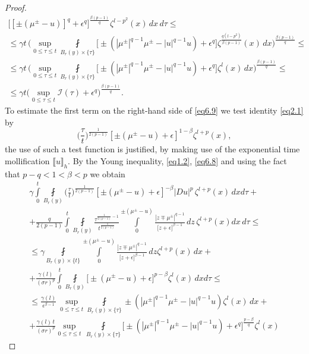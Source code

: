 \documentclass[a4paper,11pt,fullpage]{article}
\numberwithin{equation}{section}
\begin{document}
\begin{proof}
\begin{multline}
\Big[[\pm(\mu^{\pm}-u)]^q+\epsilon^q\Big]^{\frac{\beta (p-1)}{q}}\zeta^{l-p^2}(x)\,dx\,d\tau\leqslant\\\leqslant
\gamma t\,\Big(\sup\limits_{0\leqslant \tau\leqslant t}\fint\limits_{B_{ r}(y)\times\{\tau\}}\big[\pm(|\mu^{\pm}|^{q-1}\mu^{\pm}-|u|^{q-1}u)+\epsilon^q\big]\zeta^{\frac{q (l-p^2)}{\beta (p-1)}}(x)\,dx\Big)
^{\frac{\beta (p-1)}{q}}\leqslant\\\leqslant
\gamma t\,\Big(\sup\limits_{0\leqslant \tau\leqslant t}\fint\limits_{B_{ r}(y)\times\{\tau\}}\big[\pm(|\mu^{\pm}|^{q-1}\mu^{\pm}-|u|^{q-1}u)+\epsilon^q\big]\zeta^l(x)\,dx\Big)
^{\frac{\beta (p-1)}{q}}\leqslant\\\leqslant
\gamma t\Big(\sup\limits_{0\leqslant \tau\leqslant t}\mathcal{I}(\tau)+\epsilon^q\Big)^{\frac{\beta (p-1)}{q}}.
\end{multline}
To estimate the first term on the right-hand side of \eqref{eq6.9} we test identity \eqref{eq2.1} by $$\Big(\frac{\tau}{t}\Big)^{\frac{1}{2(p-1)}}[\pm(\mu^{\pm}-u)+\epsilon]^{1-\beta}\zeta^{l+p}(x),$$ 
the use of such a test function is justified,  by making use of the
exponential time mollification  $\llbracket u \rrbracket_h$.
By the Young inequality, \eqref{eq1.2}, \eqref{eq6.8} and using the fact that $p-q< 1< \beta <p$ we obtain
\begin{multline}\label{eq6.11}
\gamma\int\limits^t_0\fint\limits_{B_{r}(y)}\Big(\frac{\tau}{t}\Big)^{\frac{1}{2(p-1)}}[\pm(\mu^{\pm}-u)+\epsilon]^{-\beta}|D u|^{p}\,\zeta^{l+p}(x)\,dx d\tau+\\+\frac{q}{2(p-1)}\int\limits^t_0\fint\limits_{B_r(y)}
\frac{\tau^{\frac{1}{2(p-1)}-1}}{t^{\frac{1}{2(p-1)}}}
\int\limits_0^{\pm(\mu^{\pm}-u)}\frac{|z\mp \mu^{\pm}|^{q-1}}{\big[z+\epsilon\big]^{\beta-1}}\,dz\,\zeta^{l+p}(x) dx\,d\tau
\leqslant \\\leqslant \gamma \fint\limits_{B_{ r}(y)\times\{t\}}\int\limits_{0}^{\pm(\mu^{\pm}-u)}\frac{|z\mp\mu^{\pm}|^{q-1}}{\big[z+\epsilon\big]^{\beta-1}}\,dz\zeta^{l+p}(x)\,dx+\\+
\frac{\gamma(l)}{(\sigma r)^p} \int\limits^t_0\fint\limits_{B_{r}(y)}\big[\pm(\mu^{\pm}-u)+\epsilon]^{p-\beta}\zeta^l(x)\,dx d\tau\leqslant \\\leqslant
\frac{\gamma(l)}{\epsilon^{\beta-1}}\,\sup\limits_{0\leqslant \tau\leqslant t}
\fint\limits_{B_{r}(y)\times\{\tau\}}\pm(|\mu^{\pm}|^{q-1}\mu^{\pm}-|u|^{q-1}u)\zeta^l(x)\,dx 
+\\+\frac{\gamma(l)\,t}{(\sigma r)^p}\sup\limits_{0\leqslant \tau\leqslant t}\,\fint\limits_{B_{ r}(y)\times\{\tau\}}\big[\pm(|\mu^{\pm}|^{q-1}\mu^{\pm}-|u|^{q-1}u)+\epsilon^q\big]^{\frac{p-\beta}{q}}\zeta^l(x)

\end{multline}
\end{proof}
\end{document}
